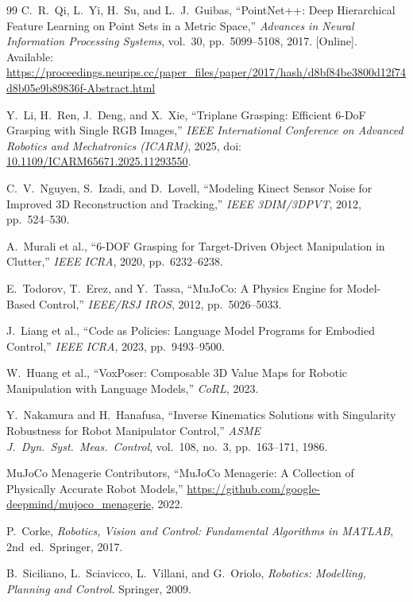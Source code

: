 \documentclass[11pt,a4paper]{report}
\begin{document}
\begin{thebibliography}{99}
C.~R.~Qi, L.~Yi, H.~Su, and L.~J.~Guibas,
``PointNet++: Deep Hierarchical Feature Learning on Point Sets in a Metric Space,''
\emph{Advances in Neural Information Processing Systems}, vol.~30, pp.~5099--5108, 2017.
[Online]. Available: \url{https://proceedings.neurips.cc/paper_files/paper/2017/hash/d8bf84be3800d12f74d8b05e9b89836f-Abstract.html}

Y.~Li, H.~Ren, J.~Deng, and X.~Xie,
``Triplane Grasping: Efficient 6-DoF Grasping with Single RGB Images,''
\emph{IEEE International Conference on Advanced Robotics and Mechatronics (ICARM)}, 2025,
doi: \href{https://doi.org/10.1109/ICARM65671.2025.11293550}{10.1109/ICARM65671.2025.11293550}.

C.~V.~Nguyen, S.~Izadi, and D.~Lovell,
``Modeling Kinect Sensor Noise for Improved 3D Reconstruction and
Tracking,'' \emph{IEEE 3DIM/3DPVT}, 2012, pp.~524--530.

A.~Murali et al., ``6-DOF Grasping for Target-Driven Object
Manipulation in Clutter,'' \emph{IEEE ICRA}, 2020, pp.~6232--6238.

E.~Todorov, T.~Erez, and Y.~Tassa,
``MuJoCo: A Physics Engine for Model-Based Control,''
\emph{IEEE/RSJ IROS}, 2012, pp.~5026--5033.

J.~Liang et al., ``Code as Policies: Language Model Programs for
Embodied Control,'' \emph{IEEE ICRA}, 2023, pp.~9493--9500.

W.~Huang et al., ``VoxPoser: Composable 3D Value Maps for Robotic
Manipulation with Language Models,'' \emph{CoRL}, 2023.

Y.~Nakamura and H.~Hanafusa, ``Inverse Kinematics Solutions with
Singularity Robustness for Robot Manipulator Control,''
\emph{ASME J.\ Dyn.\ Syst.\ Meas.\ Control}, vol.~108, no.~3,
pp.~163--171, 1986.

MuJoCo Menagerie Contributors, ``MuJoCo Menagerie: A Collection of
Physically Accurate Robot Models,''
\url{https://github.com/google-deepmind/mujoco_menagerie}, 2022.

P.~Corke, \emph{Robotics, Vision and Control: Fundamental Algorithms
in MATLAB}, 2nd~ed.\ Springer, 2017.

B.~Siciliano, L.~Sciavicco, L.~Villani, and G.~Oriolo,
\emph{Robotics: Modelling, Planning and Control}. Springer, 2009.


\end{thebibliography}
\end{document}
